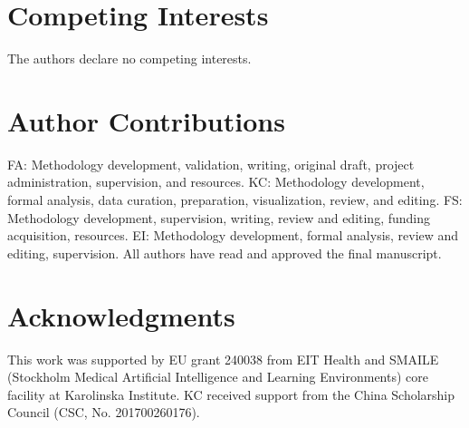 \documentclass[sn-vancouver-num]{sn-jnl}
\begin{document}
\section*{Competing Interests}
The authors declare no competing interests.

\section*{Author Contributions}
FA: Methodology development, validation, writing, original draft, project administration, supervision, and resources. KC: Methodology development, formal analysis, data curation, preparation, visualization, review, and editing. FS: Methodology development, supervision, writing, review and editing, funding acquisition, resources. EI: Methodology development, formal analysis, review and editing, supervision. All authors have read and approved the final manuscript.

\section*{Acknowledgments}
This work was supported by EU grant 240038 from EIT Health and SMAILE (Stockholm Medical Artificial Intelligence and Learning Environments) core facility at Karolinska Institute. KC received support from the China Scholarship Council (CSC, No. 201700260176).


\end{document}
